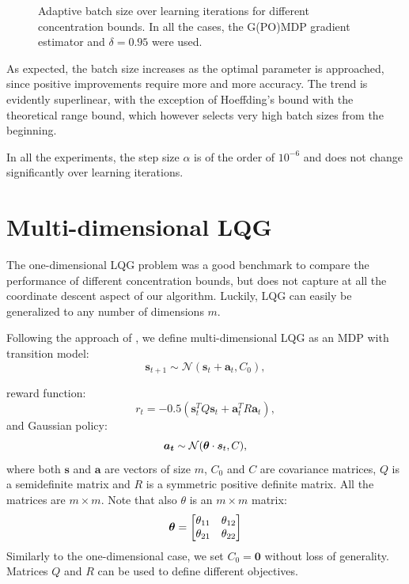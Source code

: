 \begin{figure}[h!]
\begin{adjustbox}{left}
{	\label{fig:6}
	}
\end{adjustbox}
\caption{Adaptive batch size over learning iterations for different concentration bounds. In all the cases, the G(PO)MDP gradient estimator and $\delta=0.95$ were used.}
\label{fig:8}
\end{figure}


As expected, the batch size increases as the optimal parameter is approached, since positive improvements require more and more accuracy. The trend is evidently superlinear, with the exception of Hoeffding's bound with the theoretical range bound, which however selects very high batch sizes from the beginning. 

In all the experiments, the step size $\alpha$ is of the order of $10^{-6}$ and does not change significantly over learning iterations.


\section{Multi-dimensional LQG}
The one-dimensional \ac{LQG} problem was a good benchmark to compare the performance of different concentration bounds, but does not capture at all the coordinate descent aspect of our algorithm. Luckily, \ac{LQG} can easily be generalized to any number of dimensions $m$.

Following the approach of \cite{Pirotta:2015:MRL:2888116.2888124}, we define multi-dimensional \ac{LQG} as an \ac{MDP} with transition model:
\[
	\boldsymbol{s}_{t+1} \sim \mathcal{N}(\boldsymbol{s}_t+\boldsymbol{a}_t,C_0),
\] 

reward function:
\[
	r_t=-0.5(\boldsymbol{s}_t^TQ\boldsymbol{s}_t + \boldsymbol{a}_t^TR\boldsymbol{a}_t),
\]
and Gaussian policy:
\[
	\boldsymbol{a_t} \sim \mathcal{N}(\boldsymbol{\theta} \cdot \boldsymbol{s}_t,C),
\]
where both $\boldsymbol{s}$ and $\boldsymbol{a}$ are vectors of size $m$, $C_0$ and $C$ are covariance matrices, $Q$ is a semidefinite matrix and $R$ is a symmetric positive definite matrix. All the matrices are $m\times m$. Note that also $\theta$ is an $m \times m$ matrix:
\[
\boldsymbol{\theta} = \begin{bmatrix}
\theta_{11} & \theta_{12} \\
\theta_{21} & \theta_{22}
\end{bmatrix}
\]
Similarly to the one-dimensional case, we set $C_0=\boldsymbol{0}$ without loss of generality. Matrices $Q$ and $R$ can be used to define different objectives.

